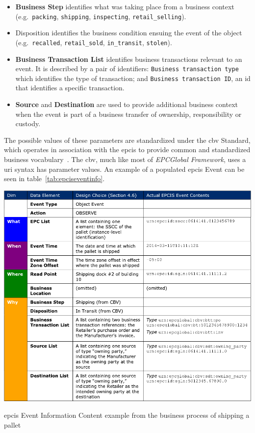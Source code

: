 \begin{itemize}
    \item \textbf{Business Step} identifies what was taking place from a business context (e.g.\ \texttt{packing}, \texttt{shipping}, \texttt{inspecting}, \texttt{retail\_selling}).
    \item \textbf{}{Disposition} identifies the business condition ensuing the event of the object (e.g.\ \texttt{recalled}, \texttt{retail\_sold}, \texttt{in\_transit}, \texttt{stolen}).
    \item \textbf{Business Transaction List} identifies business transactions relevant to an event. It is described by a pair of identifiers: \texttt{Business transaction type} which identifies the type of transaction; and \texttt{Business transaction ID}, an \ac{id} that identifies a specific transaction.
    \item \textbf{Source} and \textbf{Destination} are used to provide additional business context when the event is part of a business transfer of ownership, responsibility or custody.
\end{itemize}

The possible values of these parameters are standardized under the \ac{cbv} Standard, which operates in association with the \ac{epcis} to provide common and standardized business vocabulary~\cite{CoreBusinessVocabulary}. The \ac{cbv}, much like most of \emph{EPCGlobal Framework}, uses a \ac{uri} syntax has parameter values.
An example of a populated \ac{epcis} Event can be seen in table~\ref{tab:epciseventinfo}.

\begin{table}
    \centering
    \includegraphics[width=\textwidth]{./figs/02-state-of-the-art/epcis_data_visibility.pdf}
    \caption[\ac{epcis} Event Information Content example]{\ac{epcis} Event Information Content example from the business process of shipping a pallet~\cite{EPCISGuidelines}}
    \label{tab:epciseventinfo}
\end{table}

